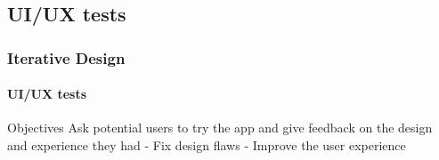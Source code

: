 \documentclass{beamer}
\begin{document}
	\subsection{UI/UX tests}
	\begin{frame}
		\frametitle{Iterative Design}
		\framesubtitle{UI/UX tests}
		\begin{alertblock}{Objectives}
			Ask potential users to try the app and give feedback on the design and experience they had
			\linebreak
			- Fix design flaws
			\linebreak
			- Improve the user experience
		\end{alertblock}
	
		\begin{figure}
			\centering
			\begin{minipage}{0.16\textwidth}

\end{minipage}
\end{figure}
\end{frame}
\end{document}
